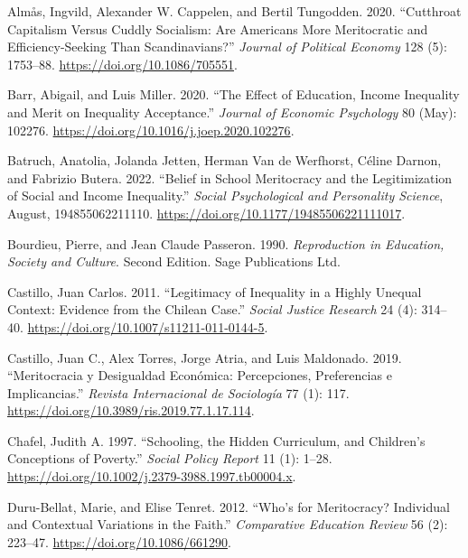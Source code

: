 \documentclass[
  letterpaper,
  DIV=11,
  numbers=noendperiod]{scrartcl}
\newlength{\cslhangindent}
\newenvironment{CSLReferences}[2] %
 {\begin{list}{}{%
  \setlength{\itemindent}{0pt}
  \setlength{\leftmargin}{0pt}
  \setlength{\parsep}{0pt}
  \ifodd #1
   \setlength{\leftmargin}{\cslhangindent}
   \setlength{\itemindent}{-1\cslhangindent}
  \fi
  \setlength{\itemsep}{#2\baselineskip}}}
 {\end{list}}
\begin{document}
\label{refs}
\begin{CSLReferences}{1}{0}
Almås, Ingvild, Alexander W. Cappelen, and Bertil Tungodden. 2020.
{``Cutthroat Capitalism Versus Cuddly Socialism: Are Americans More
Meritocratic and Efficiency-Seeking Than Scandinavians?''} \emph{Journal
of Political Economy} 128 (5): 1753--88.
\url{https://doi.org/10.1086/705551}.

Barr, Abigail, and Luis Miller. 2020. {``The Effect of Education, Income
Inequality and Merit on Inequality Acceptance.''} \emph{Journal of
Economic Psychology} 80 (May): 102276.
\url{https://doi.org/10.1016/j.joep.2020.102276}.

Batruch, Anatolia, Jolanda Jetten, Herman Van de Werfhorst, Céline
Darnon, and Fabrizio Butera. 2022. {``Belief in School Meritocracy and
the Legitimization of Social and Income Inequality.''} \emph{Social
Psychological and Personality Science}, August, 194855062211110.
\url{https://doi.org/10.1177/19485506221111017}.

Bourdieu, Pierre, and Jean Claude Passeron. 1990. \emph{Reproduction in
Education, Society and Culture}. Second Edition. Sage Publications Ltd.

Castillo, Juan Carlos. 2011. {``Legitimacy of Inequality in a Highly
Unequal Context: Evidence from the Chilean Case.''} \emph{Social Justice
Research} 24 (4): 314--40.
\url{https://doi.org/10.1007/s11211-011-0144-5}.

Castillo, Juan C., Alex Torres, Jorge Atria, and Luis Maldonado. 2019.
{``Meritocracia y Desigualdad Económica: Percepciones, Preferencias e
Implicancias.''} \emph{Revista Internacional de Sociología} 77 (1): 117.
\url{https://doi.org/10.3989/ris.2019.77.1.17.114}.

Chafel, Judith A. 1997. {``Schooling, the Hidden Curriculum, and
Children's Conceptions of Poverty.''} \emph{Social Policy Report} 11
(1): 1--28. \url{https://doi.org/10.1002/j.2379-3988.1997.tb00004.x}.

Duru-Bellat, Marie, and Elise Tenret. 2012. {``Who's for Meritocracy?
Individual and Contextual Variations in the Faith.''} \emph{Comparative
Education Review} 56 (2): 223--47. \url{https://doi.org/10.1086/661290}.


\end{CSLReferences}
\end{document}
